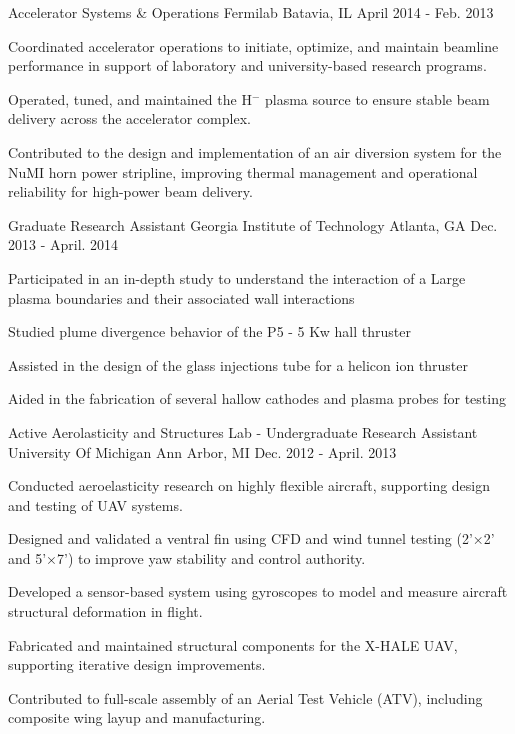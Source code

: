 \begin{cventries}
\cventry
{Accelerator Systems \& Operations} %
{Fermilab} %
{Batavia, IL} %
{April 2014 - Feb. 2013} %
{ %
\begin{cvitems}
\item {Coordinated accelerator operations to initiate, optimize, and maintain beamline performance in support of laboratory and university-based research programs.}
\item {Operated, tuned, and maintained the H$^-$ plasma source to ensure stable beam delivery across the accelerator complex.}
\item {Contributed to the design and implementation of an air diversion system for the NuMI horn power stripline, improving thermal management and operational reliability for high-power beam delivery.}
\end{cvitems} 
}
\vspace{6mm}
\cventry
{Graduate Research Assistant} %
{Georgia Institute of Technology} %
{Atlanta, GA} %
{Dec. 2013 - April. 2014} %
{ %
\begin{cvitems}
\item {Participated in an in-depth study to understand the interaction of a Large plasma boundaries and their associated wall interactions}
\item {Studied plume divergence behavior of the P5 - 5 Kw hall thruster}
\item {Assisted in the design of the glass injections tube for a helicon ion thruster}
\item {Aided in the fabrication of several hallow cathodes and plasma probes for testing}
\end{cvitems}
}
\vspace{6mm}
\cventry
{Active Aerolasticity and Structures Lab - Undergraduate Research Assistant } %
{University Of Michigan} %
{Ann Arbor, MI} %
{Dec. 2012 - April. 2013} %
{ %
\begin{cvitems}
\item Conducted aeroelasticity research on highly flexible aircraft, supporting design and testing of UAV systems.
\item Designed and validated a ventral fin using CFD and wind tunnel testing (2'×2' and 5'×7') to improve yaw stability and control authority.
\item Developed a sensor-based system using gyroscopes to model and measure aircraft structural deformation in flight.
\item Fabricated and maintained structural components for the X-HALE UAV, supporting iterative design improvements.
\item Contributed to full-scale assembly of an Aerial Test Vehicle (ATV), including composite wing layup and manufacturing.
\end{cvitems}
}
\end{cventries}